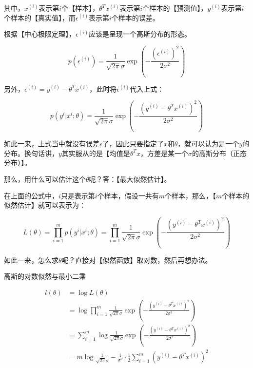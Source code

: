 \documentclass[UTF8]{ctexart}
\begin{document}
其中，$x^{(i)}$表示第$i$个【样本】，$\theta^{T}x^{(i)}$表示第$i$个样本的【预测值】，$y^{(i)}$表示第$i$个样本的【真实值】，而$\epsilon^{(i)}$表示第$i$个样本的误差。

根据【中心极限定理】，$\epsilon^{(i)}$应该是呈现一个高斯分布的形态。

\begin{displaymath}
p(\epsilon^{(i)})=\frac{1}{\sqrt{2\pi}\sigma}\exp(-\frac{(\epsilon^{(i)})^{2}}{2\sigma^{2}})
\end{displaymath}

另外，$\epsilon^{(i)} = y^{(i)} - \theta^{T}x^{(i)}$，此时将$\epsilon^{(i)}$代入上式：

\begin{displaymath}
p(y^{i}|x^{i};\theta)=\frac{1}{\sqrt{2\pi}\sigma}\exp(-\frac{(y^{(i)} - \theta^{T}x^{(i)})^{2}}{2\sigma^{2}})
\end{displaymath}

如此一来，上式当中就没有误差$\epsilon$了，因此只要指定了$x$和$\theta$，就可以认为是一个$y$的分布。换句话讲，$y$其实服从的是【均值是$\theta^{T}x$，方差是某一个$\sigma$的高斯分布（正态分布）】。

那么，用什么可以估计这个$\theta$呢？答：【最大似然估计】。

在上面的公式中，$i$只是表示第$i$个样本，假设一共有$m$个样本，那么，【$m$个样本的似然估计】就可以表示为：

\begin{displaymath}
L(\theta)=\prod_{i=1}^{m}p(y^{i}|x^{i};\theta) = \prod_{i=1}^{m}\frac{1}{\sqrt{2\pi}\sigma}\exp(-\frac{(y^{(i)} - \theta^{T}x^{(i)})^{2}}{2\sigma^{2}})
\end{displaymath}

如此一来，怎么求$\theta$呢？直接对【似然函数】取对数，然后再想办法。

高斯的对数似然与最小二乘


\begin{equation}
\begin{aligned}
l(\theta)&=\log L(\theta)\\
&=\log \prod_{i=1}^{m}\frac{1}{\sqrt{2\pi}\sigma}\exp(-\frac{(y^{(i)} - \theta^{T}x^{(i)})^{2}}{2\sigma^{2}})\\
&=\sum_{i=1}^{m} \log \frac{1}{\sqrt{2\pi}\sigma}\exp(-\frac{(y^{(i)} - \theta^{T}x^{(i)})^{2}}{2\sigma^{2}})\\
&=m\log \frac{1}{\sqrt{2\pi}\sigma} - \frac{1}{\sigma^{2}} \cdot \frac{1}{2} \sum_{i=1}^{m}(y^{(i)} - \theta^{T}x^{(i)})^{2}
\end{aligned}
\end{equation}
\end{document}

